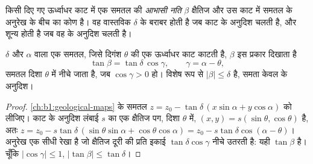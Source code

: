 \begin{definition}[आभासी नति]\label{def:b1:cross-sections:apparent-dip}
किसी दिए गए ऊर्ध्वाधर काट में एक समतल की \emph{आभासी नति} $\beta$ क्षैतिज और उस काट में समतल के
अनुरेख के बीच का कोण है। वह वास्तविक  $\delta$ के बराबर होती है जब काट  के अनुदिश चलती है, और
शून्य होती है जब वह  के अनुदिश चलती है।
\end{definition}

\begin{theorem}[आभासी नति]\label{thm:b1:cross-sections:apparent-dip}
 $\delta$ और  $\alpha$ वाला एक समतल, जिसे दिगंश $\theta$ की एक ऊर्ध्वाधर काट काटती है, 
$\beta$ इस प्रकार दिखाता है
\[
  \tan\beta = \tan\delta\,\cos\gamma, \qquad \gamma = \alpha - \theta ,
\]
समतल दिशा $\theta$ में नीचे जाता है, जब $\cos\gamma > 0$ हो। विशेष रूप से $|\beta| \le \delta$ है, समता केवल
 के अनुदिश।
\end{theorem}

\begin{proof}
\cref{ch:b1:geological-maps} के समतल $z = z_0 - \tan\delta\,(x\sin\alpha + y\cos\alpha)$ को लीजिए। काट के
अनुदिश लंबाई $s$ का एक क्षैतिज पग, दिशा $\theta$ में, $(x, y) = s(\sin\theta, \cos\theta)$ है, अतः
$z = z_0 - s\tan\delta\,(\sin\theta\sin\alpha + \cos\theta\cos\alpha) =
z_0 - s\tan\delta\cos(\alpha - \theta)$। अनुरेख एक सीधी रेखा है जो क्षैतिज दूरी की प्रति इकाई
$\tan\delta\cos\gamma$ नीचे उतरती है: यही $\tan\beta$ है। चूँकि $|\cos\gamma| \le 1$, $|\tan\beta| \le \tan\delta$।
\end{proof}

